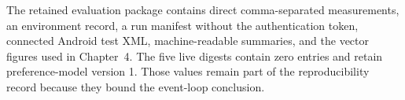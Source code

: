 The retained evaluation package contains direct comma-separated measurements, an environment record, a run manifest without the authentication token, connected Android test XML, machine-readable summaries, and the vector figures used in Chapter~4.
The five live digests contain zero entries and retain preference-model version 1.
Those values remain part of the reproducibility record because they bound the event-loop conclusion.
